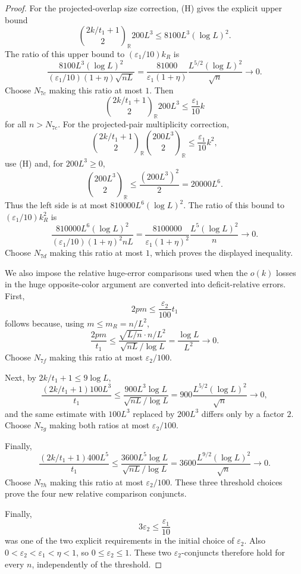 \begin{proof}
For the projected-overlap size correction, (H) gives the explicit upper bound
\[
\binom{2k/t_1+1}{2}_{\mathbb R}200L^3
\le 8100L^3(\log L)^2.
\]
The ratio of this upper bound to \((\varepsilon_1/10)k_R\) is
\[
\frac{8100L^3(\log L)^2}
     {(\varepsilon_1/10)(1+\eta)\sqrt{nL}}
=\frac{81000}{\varepsilon_1(1+\eta)}
  \frac{L^{5/2}(\log L)^2}{\sqrt n}\to0.
\]
Choose \(N_{7c}\) making this ratio at most \(1\).  Then
\[
\binom{2k/t_1+1}{2}_{\mathbb R}200L^3
  \le \frac{\varepsilon_1}{10}k
\]
for all \(n>N_{7c}\).
For the projected-pair multiplicity correction,
\[
\binom{2k/t_1+1}{2}_{\mathbb R}\binom{200L^3}{2}_{\mathbb R}
  \le \frac{\varepsilon_1}{10}k^2,
\]
use (H) and, for \(200L^3\ge0\),
\[
\binom{200L^3}{2}_{\mathbb R}
\le \frac{(200L^3)^2}{2}=20000L^6.
\]
Thus the left side is at most \(810000L^6(\log L)^2\).  The ratio of this
bound to \((\varepsilon_1/10)k_R^2\) is
\[
\frac{810000L^6(\log L)^2}
     {(\varepsilon_1/10)(1+\eta)^2nL}
=\frac{8100000}{\varepsilon_1(1+\eta)^2}
  \frac{L^5(\log L)^2}{n}\to0.
\]
Choose \(N_{7d}\) making this ratio at most \(1\), which proves the displayed
inequality.

We also impose the relative huge-error comparisons used when the \(o(k)\)
losses in the huge opposite-color argument are converted into
deficit-relative errors.  First,
\[
2pm\le\frac{\varepsilon_2}{100}t_1
\]
follows because, using \(m\le m_R=n/L^2\),
\[
\frac{2pm}{t_1}
\le
\frac{\sqrt{L/n}\cdot n/L^2}{\sqrt{nL}/\log L}
=\frac{\log L}{L^2}\to0.
\]
Choose \(N_{7f}\) making this ratio at most \(\varepsilon_2/100\).

Next, by \(2k/t_1+1\le9\log L\),
\[
\frac{(2k/t_1+1)100L^3}{t_1}
\le
\frac{900L^3\log L}{\sqrt{nL}/\log L}
=900\frac{L^{5/2}(\log L)^2}{\sqrt n}\to0,
\]
and the same estimate with \(100L^3\) replaced by \(200L^3\) differs only by a
factor \(2\).  Choose \(N_{7g}\) making both ratios at most
\(\varepsilon_2/100\).

Finally,
\[
\frac{(2k/t_1+1)400L^5}{t_1}
\le
\frac{3600L^5\log L}{\sqrt{nL}/\log L}
=3600\frac{L^{9/2}(\log L)^2}{\sqrt n}\to0.
\]
Choose \(N_{7h}\) making this ratio at most \(\varepsilon_2/100\).
These three threshold choices prove the four new relative comparison conjuncts.

Finally,
\[
3\varepsilon_2\le\frac{\varepsilon_1}{10}
\]
was one of the two explicit requirements in the initial choice of
\(\varepsilon_2\).  Also \(0<\varepsilon_2<\varepsilon_1<\eta<1\), so
\(0\le\varepsilon_2\le1\).  These two \(\varepsilon_2\)-conjuncts therefore
hold for every \(n\), independently of the threshold.


\end{proof}
